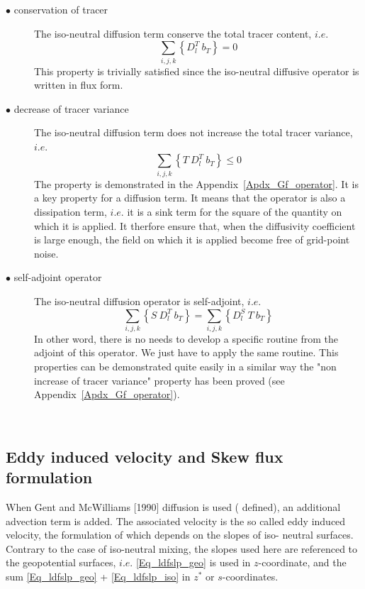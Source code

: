 \begin{description}
\item[$\bullet$ conservation of tracer] The iso-neutral diffusion term conserve the 
total tracer content, $i.e.$
\begin{equation} \label{Gf_property1}
\sum_{i,j,k} \left\{ D_l^T \ b_T \right\} = 0
\end{equation}
This property is trivially satisfied since the iso-neutral diffusive operator 
is written in flux form.

\item[$\bullet$ decrease of tracer variance] The iso-neutral diffusion term does 
not increase the total tracer variance, $i.e.$
\begin{equation} \label{Gf_property1}
\sum_{i,j,k} \left\{ T \ D_l^T \ b_T \right\} \leq 0
\end{equation}
The property is demonstrated in the Appendix~\ref{Apdx_Gf_operator}. It is a 
key property for a diffusion term. It means that the operator is also a dissipation 
term, $i.e.$ it is a sink term for the square of the quantity on which it is applied. 
It therfore ensure that, when the diffusivity coefficient is large enough, the field 
on which it is applied become free of grid-point noise.

\item[$\bullet$ self-adjoint operator] The iso-neutral diffusion operator is self-adjoint, 
$i.e.$
\begin{equation} \label{Gf_property1}
\sum_{i,j,k} \left\{ S \ D_l^T \ b_T \right\} = \sum_{i,j,k} \left\{ D_l^S \ T \ b_T \right\} 
\end{equation}
In other word, there is no needs to develop a specific routine from the adjoint of this 
operator. We just have to apply the same routine. This properties can be demonstrated 
quite easily in a similar way the "non increase of tracer variance" property has been 
proved (see Appendix~\ref{Apdx_Gf_operator}).
\end{description}


$\ $\newline      %
\subsection{ Eddy induced velocity and Skew flux formulation}

When Gent and McWilliams [1990] diffusion is used ( defined), 
an additional advection term is added. The associated velocity is the so called 
eddy induced velocity, the formulation of which depends on the slopes of iso-
neutral surfaces. Contrary to the case of iso-neutral mixing, the slopes used 
here are referenced to the geopotential surfaces, $i.e.$ \eqref{Eq_ldfslp_geo} 
is used in $z$-coordinate, and the sum \eqref{Eq_ldfslp_geo}
+ \eqref{Eq_ldfslp_iso} in $z^*$ or $s$-coordinates. 

